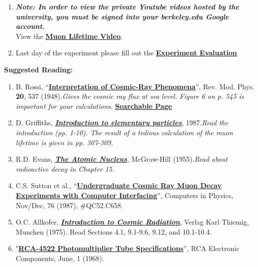 \documentclass{../lab}
\begin{document}
\begin{enumerate}
    \item \emph{\textbf{Note: In order to view the private Youtube videos hosted by the university, you must be signed into your berkeley.edu Google account.}} \\
    View the \href{http://youtu.be/uqH0qRIwBmg}{\textbf{Muon Lifetime Video}}.

    \item Last day of the experiment please fill out the \href{\ExperimentEvaluation}{\textbf{Experiment Evaluation}}

\end{enumerate}

\noindent\textbf{Suggested Reading:}

\begin{enumerate}
    \item B. Rossi, ``\href{http://rmp.aps.org/abstract/RMP/v20/i3/p537\_1}{\textbf{Interpretation of Cosmic-Ray Phenomena}}'', Rev. Mod. Phys. \textbf{20}, 537 (1948).\emph{Gives the cosmic ray flux at sea level. Figure 6 on p. 545 is important for your calculations.} \href{http://physics111.lib.berkeley.edu/Physics111/Reprints/MUO/02-Cosmic-Ray\_Phenomena.pdf}{\textbf{Searchable Page}}

    \item D. Griffiths, \emph{\href{http://physics111.lib.berkeley.edu/Physics111/Reprints/MUO/04-Introduction\_to\_Elementary\_Particles.pdf}{\textbf{Introduction to elementary particles}}}, 1987.\emph{Read the introduction (pp. 1-10). The result of a tedious calculation of the muon lifetime is given in pp. 307-309.}

    \item R.D. Evans, \emph{\href{http://physics111.lib.berkeley.edu/Physics111/Reprints/MUO/05-The\_Atomic\_Nucleus.pdf}{\textbf{The Atomic Nucleus}}}, McGraw-Hill (1955).\emph{Read about radioactive decay in Chapter 15.}

    \item C.S. Sutton et al., ``\href{http://physics111.lib.berkeley.edu/Physics111/Reprints/MUO/01-Undergraduate\_Cosmic\_Ray\_Muon\_Decay.pdf}{\textbf{Undergraduate Cosmic Ray Muon Decay Experiments with Computer Interfacing}}'', Computers in Physics, Nov/Dec, 76 (1987), \#QC52.C658.

    \item O.C. Allkofer, \emph{\href{http://physics111.lib.berkeley.edu/Physics111/Reprints/MUO/06-Introduction\_to\_Cosmic\_Radiation.pdf}{\textbf{Introduction to Cosmic Radiation}}}, Verlag Karl Thiemig, Munchen (1975). Read Sections 4.1, 9.1-9.6, 9.12, and 10.1-10.4.

    \item "\href{http://physics111.lib.berkeley.edu/Physics111/Equipment\_Manuals/RCA\_PMT.pdf}{\textbf{RCA-4522 Photomultiplier Tube Specifications}}”, RCA Electronic Components, June, 1 (1968).
\end{enumerate}
\end{document}
